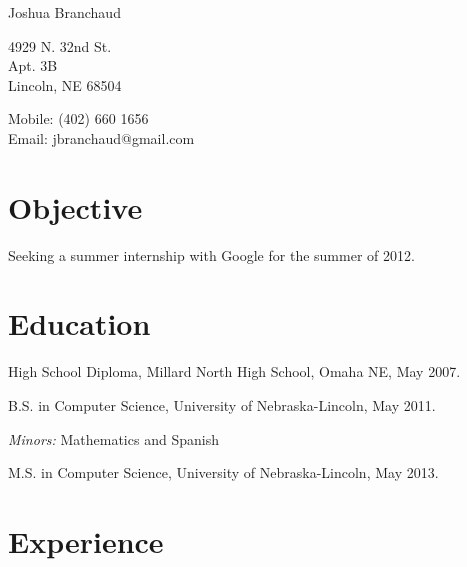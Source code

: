 \documentclass[10pt,letterpaper]{article}
\def\name{Joshua Branchaud}
\renewenvironment{itemize}{
  \begin{list}{}{
    \setlength{\leftmargin}{1.5em}
    \setlength{\itemsep}{0.25em}
    \setlength{\parskip}{0pt}
    \setlength{\parsep}{0.25em}
  }
}{
  \end{list}
}
\begin{document}
{\huge \name}


\vspace{0.25in}

\begin{minipage}[t]{0.5\textwidth}
  4929 N. 32nd St. \\
  Apt. 3B \\
  Lincoln, NE 68504
\end{minipage}
\begin{minipage}[t]{0.5\textwidth}
  Mobile: (402) 660 1656 \\
  Email: jbranchaud@gmail.com \\
\end{minipage}

\section*{Objective}

\begin{itemize}
    \item Seeking a summer internship with Google for the summer of 2012.
\end{itemize}

\section*{Education}

\begin{itemize}
  \item High School Diploma, Millard North High School, Omaha NE, May 2007.

  \item B.S. in Computer Science, University of Nebraska-Lincoln, May 2011.

    \begin{itemize}
        \item \textit{Minors:} Mathematics and Spanish
    \end{itemize}
    
    \item M.S. in Computer Science, University of Nebraska-Lincoln, May 2013.

\end{itemize}

\section*{Experience}
\end{document}

